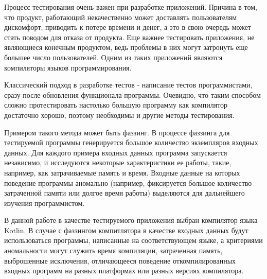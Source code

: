 \documentclass[times,specification,annotation]{itmo-student-thesis}
\begin{document}





\tableofcontents

\startprefacepage

Процесс тестирования очень важен при разработке приложений. Причина в том, что продукт, работающий некачественно может доставлять пользователям дискомфорт, приводить к потере времени и денег, а это в свою очередь может стать поводом для отказа от продукта. Еще важнее тестировать приложения, не являющиеся конечным продуктом, ведь проблемы в них могут затронуть еще большее число пользователей. Одним из таких приложений являются компиляторы языков программирования.

Классический подход в разработке тестов - написание тестов программистами, сразу после обновления функционала программы. Очевидно, что таким способом сложно протестировать настолько большую программу как компилятор достаточно хорошо, поэтому необходимы и другие методы тестирования.

Примером такого метода может быть фаззинг. В процессе фаззинга для тестируемой программы генерируется большое количество экземпляров входных данных. Для каждого примера входных данных программа запускается независимо, и исследуются некоторые характеристики ее работы, такие, например, как затрачиваемые память и время. Входные данные на которых поведение программы аномально (например, фиксируется большое количество затраченной памяти или долгое время работы) выделяются для дальнейшего изучения программистом.

В данной работе в качестве тестируемого приложения выбран компилятор языка Kotlin. В случае с фаззингом компитлятора в качестве входных данных будут использоваться программы, написанные на соответствующем языке, а критериями аномальности могут служить время компиляции, затраченная память, выброшенные исключения, отличающееся поведение откомпилированных входных программ на разных платформах или разных версиях компилятора.
\end{document}
